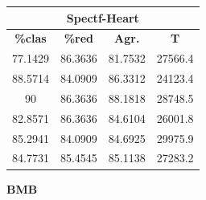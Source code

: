 \documentclass[11pt,a4paper]{article}
\theoremstyle{definition}
\begin{document}
\begin{tabbing}
{		\begin{tabular}{|c|c|c|c|}
			\hline
			\multicolumn{4}{|c|}{\textbf{Spectf-Heart}} \\ \hline
			\textbf{\%clas} & \textbf{\%red} & \textbf{Agr.} & \textbf{T} \\ \hline 
			77.1429 & 86.3636 & 81.7532 & 27566.4 \\ \hline
88.5714 & 84.0909 & 86.3312 & 24123.4 \\ \hline
90 & 86.3636 & 88.1818 & 28748.5 \\ \hline
82.8571 & 86.3636 & 84.6104 & 26001.8 \\ \hline
85.2941 & 84.0909 & 84.6925 & 29975.9 \\ \hline
84.7731 & 85.4545 & 85.1138 & 27283.2 \\ \hline
		\end{tabular}
		}
	\end{tabbing}
	
	\textbf{BMB}
	
\end{document}
